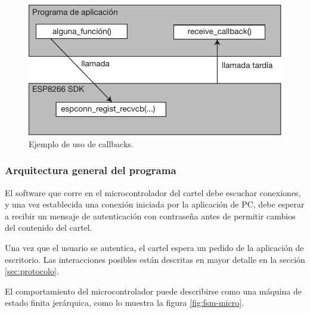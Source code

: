 \begin{figure}[ht!]
	\begin{center}
		\centering
		\includegraphics[scale=0.8]{imagenes/callbacks.pdf}
		\caption{Ejemplo de uso de callbacks.}
		\label{fig:callbacks}
	\end{center}
\end{figure}



\subsubsection{Arquitectura general del programa}

El software que corre en el microcontrolador del cartel debe escuchar conexiones, y una vez establecida una conexión iniciada por la aplicación de PC, debe esperar a recibir un mensaje de autenticación con contraseña antes de permitir cambios del contenido del cartel.

Una vez que el usuario se autentica, el cartel espera un pedido de la aplicación de escritorio. Las interacciones posibles están descritas en mayor detalle en la sección \ref{sec:protocolo}.

El comportamiento del microcontrolador puede describirse como una máquina de estado finita jerárquica, como lo muestra la figura \ref{fig:fsm-micro}.

